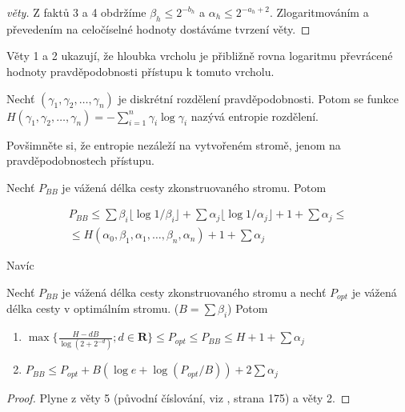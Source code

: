 \begin{proof}[věty]
Z faktů 3 a 4 obdržíme $\beta_h \leq 2^{-b_h}$ a $\alpha_h \leq 2^{-a_h+2}$. 
Zlogaritmováním a převedením na celočíselné hodnoty dostáváme tvrzení věty.
\end{proof}

\par
Věty 1 a 2 ukazují, že hloubka vrcholu je přibližně rovna logaritmu 
pře\-vrá\-ce\-né hodnoty prav\-dě\-po\-dob\-nosti přístupu k tomuto vrcholu.

\begin{defn}
Nechť $(\gamma_1,\gamma_2, \ldots, \gamma_n)$ je diskrétní rozdělení 
pravděpodobnosti. Potom se funkce 
$H(\gamma_1,\gamma_2, \ldots, \gamma_n) = - \sum_{i = 1}^{n}\gamma_i\log{\gamma_i}$ 
nazývá entropie rozdělení.
\end{defn}

\par
Povšimněte si, že entropie nezáleží na vytvořeném stromě, 
jenom na prav\-dě\-po\-dob\-nostech přístupu. 

\begin{theorem}
Nechť $P_{BB}$ je vážená délka cesty zkonstruovaného stromu. Potom

\begin{eqnarray} 
\nonumber P_{BB} \leq \sum{\beta_i} \lfloor\log{1/\beta_i}\rfloor + \sum{\alpha_j} \lfloor\log{1/\alpha_j}\rfloor + 1 + \sum{\alpha_j} \leq
\\ \leq H(\alpha_0,\beta_1,\alpha_1,\ldots,\beta_n,\alpha_n) + 1 + \sum{\alpha_j}
\end{eqnarray} 
\end{theorem}
Navíc
\begin{theorem}
Nechť $P_{BB}$ je vážená délka cesty zkonstruovaného stromu a nechť 
$P_{opt}$ je vážená délka cesty v optimálním stromu. ($B = \sum\beta_i$) 
Potom 
\begin{enumerate}
\item $\max\{\frac{H-dB}{\log{(2+2^{-d})}}; d \in \mathbf{R}\} \leq P_{opt} \leq P_{BB} \leq H + 1 + \sum{\alpha_j}$
\item $P_{BB} \leq P_{opt} + B(\log e + \log(P_{opt}/B)) + 2\sum{\alpha_j}$
\end{enumerate}

\end{theorem}
\begin{proof}
Plyne z věty 5 (původní číslování, viz \cite{mehlhorn}, strana 175) a věty 2.
\end{proof}

